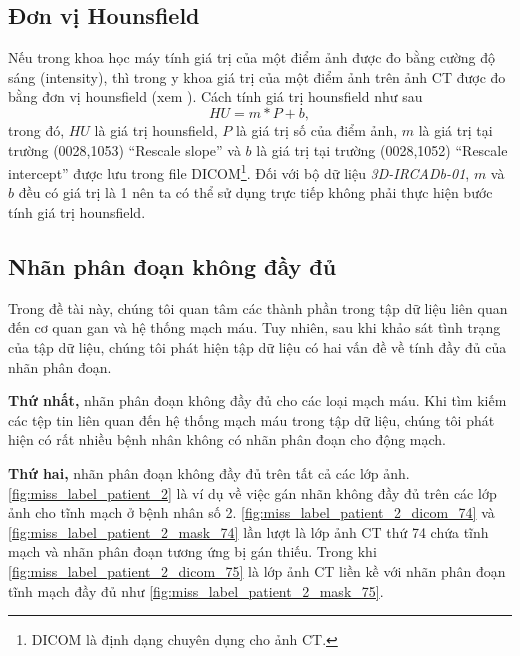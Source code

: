 \subsection{Đơn vị Hounsfield}
\label{subsec:don_vi_hounsfield}
	Nếu trong khoa học máy tính giá trị của một điểm ảnh được đo bằng cường độ sáng (intensity), thì trong y khoa giá trị của một điểm ảnh trên ảnh CT được đo bằng đơn vị hounsfield (xem \cite{medicalconnections}). Cách tính giá trị hounsfield như sau
	\begin{equation}
		HU = m * P + b,
		\label{eqn:hounsfield}
	\end{equation}
	trong đó, $HU$ là giá trị hounsfield, $P$ là giá trị số của điểm ảnh, $m$ là giá trị tại trường (0028,1053) ``Rescale slope'' và $b$ là giá trị tại trường (0028,1052) ``Rescale intercept'' được lưu trong file DICOM\footnote{DICOM là định dạng chuyên dụng cho ảnh CT.}. Đối với bộ dữ liệu \textit{3D-IRCADb-01}, $m$ và $b$ đều có giá trị là 1 nên ta có thể sử dụng trực tiếp không phải thực hiện bước tính giá trị hounsfield.
	
\subsection{Nhãn phân đoạn không đầy đủ}
\label{subsec:nhan_phan_doan_khong_day_du}
	Trong đề tài này, chúng tôi quan tâm các thành phần trong tập dữ liệu liên quan đến cơ quan gan và hệ thống mạch máu. Tuy nhiên, sau khi khảo sát tình trạng của tập dữ liệu, chúng tôi phát hiện tập dữ liệu có hai vấn đề về tính đầy đủ của nhãn phân đoạn.
	
	\textbf{Thứ nhất,} nhãn phân đoạn không đầy đủ cho các loại mạch máu. Khi tìm kiếm các tệp tin liên quan đến hệ thống mạch máu trong tập dữ liệu, chúng tôi phát hiện có rất nhiều bệnh nhân không có nhãn phân đoạn cho động mạch.
	
	\textbf{Thứ hai,} nhãn phân đoạn không đầy đủ trên tất cả các lớp ảnh. \autoref{fig:miss_label_patient_2} là ví dụ về việc gán nhãn không đầy đủ trên các lớp ảnh cho tĩnh mạch ở bệnh nhân số 2. \autoref{fig:miss_label_patient_2_dicom_74} và \autoref{fig:miss_label_patient_2_mask_74} lần lượt là lớp ảnh CT thứ 74 chứa tĩnh mạch và nhãn phân đoạn tương ứng bị gán thiếu. Trong khi \autoref{fig:miss_label_patient_2_dicom_75} là lớp ảnh CT liền kề với nhãn phân đoạn tĩnh mạch đầy đủ như \autoref{fig:miss_label_patient_2_mask_75}.
	

